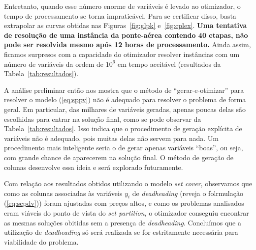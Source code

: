 \documentclass[12pt,a4paper]{article}
\begin{document}
Entretanto, quando esse número enorme de variáveis é levado ao otimizador, o tempo de processamento
se torna impraticável. Para se certificar disso, basta extrapolar as curvas obtidas nas
Figuras~\ref{fig:glpk} e~\ref{fig:cplex}. {\bf Uma tentativa de resolução de uma instância da
ponte-aérea contendo 40 etapas, não pode ser resolvida mesmo após 12 horas de processamento.} Ainda
assim, ficamos surpresos com a capacidade do otimizador resolver instâncias com um número de
variáveis da ordem de $10^6$ em tempo aceitável (resultados da Tabela~\ref{tab:resultados}).

A análise preliminar então nos mostra que o método de ``gerar-e-otimizar'' para resolver o modelo
(\ref{eq:sppv}) não é adequado para resolver o problema de forma geral. Em particular, das milhares
de variáveis geradas, apenas poucas delas são escolhidas para entrar na solução final, como se pode
observar da Tabela~\ref{tab:resultados}. Isso indica que o procedimento de geração explícita de 
variáveis não é adequado, pois muitas delas não servem para nada. Um procedimento mais inteligente
seria o de gerar apenas variáveis ``boas'', ou seja, com grande chance de aparecerem na solução 
final. O método de geração de colunas desenvolve essa ideia e será explorado futuramente.

Com relação aos resultados obtidos utilizando o modelo {\it set cover}, observamos que como as 
colunas associadas às variáveis $y_i$ de {\it deadheading} (reveja o folrmulação (\ref{eq:scpdv})) 
foram ajustadas com preços altos, e como os problemas analisados eram viáveis do ponto de vista do 
{\it set partition}, o otimizador conseguiu encontrar as mesmas soluções obitidas sem a presença de 
{\it deadheading}. Concluímos que a utilização de {\it deadheading} só será realizada se for 
estritamente necessária para viabilidade do problema.




 
\end{document}

